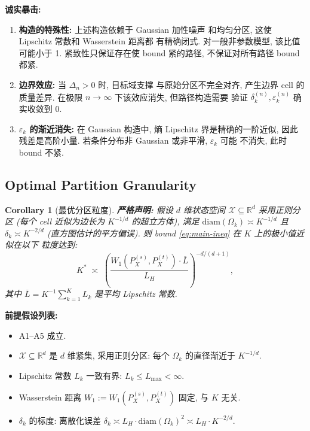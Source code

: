 \documentclass[12pt,a4paper]{article}
\newtheorem{corollary}[theorem]{Corollary}
\newcommand{\R}{\mathbb{R}}
\newcommand{\cX}{\mathcal{X}}
\newcommand{\Wass}{W_1}
\newcommand{\diam}{\mathrm{diam}}
\newcommand{\critique}{\medskip\noindent\textbf{诚实暴击: }}
\begin{document}
\bigskip
\critique
\begin{enumerate}
    \item \textbf{构造的特殊性:} 上述构造依赖于 Gaussian 加性噪声
          和均匀分区, 这使 Lipschitz 常数和 Wasserstein 距离都
          有精确闭式. 对一般非参数模型, 该比值可能小于 1.
          紧致性只保证存在使 bound 紧的路径, 不保证对所有路径
          bound 都紧.
    \item \textbf{边界效应:} 当 $\Delta_n > 0$ 时, 目标域支撑
          与原始分区不完全对齐, 产生边界 cell 的质量差异.
          在极限 $n\to\infty$ 下该效应消失, 但路径构造需要
          验证 $\delta_k^{(n)},\varepsilon_k^{(n)}$ 确实收敛到 0.
    \item \textbf{$\varepsilon_k$ 的渐近消失:} 在 Gaussian 构造中,
          熵 Lipschitz 界是精确的一阶近似, 因此残差是高阶小量.
          若条件分布非 Gaussian 或非平滑, $\varepsilon_k$ 可能
          不消失, 此时 bound 不紧.
\end{enumerate}


\subsection{Optimal Partition Granularity}

\begin{corollary}[最优分区粒度]\label{cor:granularity}
\textbf{严格声明:}
假设 $d$ 维状态空间 $\cX\subseteq\R^d$ 采用正则分区
(每个 cell 近似为边长为 $K^{-1/d}$ 的超立方体), 满足
$\diam(\Omega_k)\asymp K^{-1/d}$ 且
$\delta_k\asymp K^{-2/d}$ (直方图估计的平方偏误).
则 bound \eqref{eq:main-ineq} 在 $K$ 上的极小值近似在以下
粒度达到:
\begin{equation}\label{eq:opt-K}
    K^* \;\asymp\;
    \left(\frac{\Wass(P^{(s)}_X,P^{(t)}_X)\cdot\overline{L}}
               {L_H}\right)^{-d/(d+1)},
\end{equation}
其中 $\overline{L}=K^{-1}\sum_{k=1}^K L_k$ 是平均 Lipschitz 常数.
\end{corollary}

\medskip\noindent
\textbf{前提假设列表:}
\begin{itemize}
    \item A1--A5 成立.
    \item $\cX\subseteq\R^d$ 是 $d$ 维紧集, 采用正则分区:
          每个 $\Omega_k$ 的直径渐近于 $K^{-1/d}$.
    \item Lipschitz 常数 $L_k$ 一致有界: $L_k\leq L_{\max}<\infty$.
    \item Wasserstein 距离 $\Wass:=W_1(P^{(s)}_X,P^{(t)}_X)$ 固定,
          与 $K$ 无关.
    \item $\delta_k$ 的标度: 离散化误差 $\delta_k\asymp L_H\cdot\diam(\Omega_k)^2
          \asymp L_H\cdot K^{-2/d}$.
\end{itemize}
\end{document}
